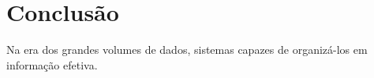 \section{Conclusão}
Na era dos grandes volumes de dados, sistemas capazes de organizá-los em informação efetiva.



